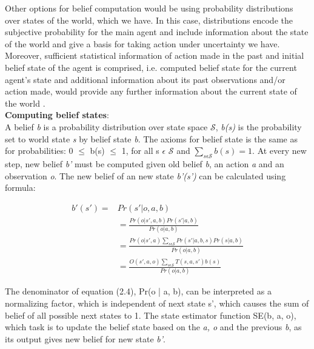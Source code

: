 Other options for belief computation would be using probability distributions over states of the world, which we have. In this case, distributions encode the subjective probability for the main agent and include information about the state of the world and give a basis for taking action under uncertainty we have.  Moreover, sufficient statistical information of action made in the past and initial belief state of the agent is comprised, i.e. computed belief state for the current agent’s state and additional information about its past observations and/or action made, would provide any further information about the current state of the world \cite{belief}. \\

\textbf{Computing belief states}\cite{belief}: \\

A belief \textit{b} is a probability distribution over state space $\mathscr{S}$, \textit{b(s)} is the probability set to world state \textit{s} by belief state \textit{b}. The axioms for belief state is the same as for probabilities: 0 $\leqslant$ b(s) $\leqslant$ 1, for all s $\epsilon$ $\mathscr{S}$ and $\sum_{s \epsilon \mathscr{S} } b(s) = 1.$ At every new step, new belief \textit{b'} must be  computed given old belief \textit{b}, an action \textit{a} and an observation \textit{o}. The new belief of an new state \textit{b'(s')} can be calculated using formula:

\begin{equation}
\begin{split}
b'(s') = & \displaystyle Pr(s'|o, a, b) \\ 
& = \displaystyle \frac{Pr(o|s', a, b) Pr(s'|a, b)}{Pr(o|a, b)} \\
& = \displaystyle \frac{Pr(o|s', a) \sum_{s \epsilon \mathscr{S}} Pr(s'|a, b, s) Pr(s|a, b)}{Pr(o|a, b)} \\
& = \displaystyle \frac{O(s', a, o) \sum_{s \epsilon \mathscr{S}} T(s, a, s') b(s)}{Pr(o|a, b) }
\end{split}
\end{equation}

The denominator of equation (2.4), Pr(o | a, b), can be interpreted as a normalizing factor, which is independent of next state s', which causes the sum of belief of all possible next states to 1. The state estimator function SE(b, a, o), which task is to update the belief state based on the \textit{a, o} and the previous \textit{b}, as its output gives new belief for new state \textit{b'}. \\

